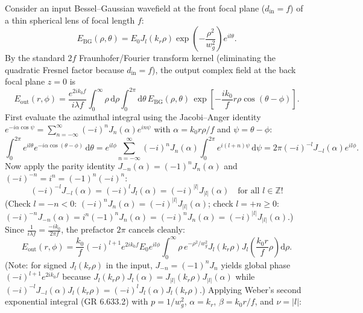 \documentclass[10pt,letterpaper]{article}
\newcommand{\abs}[1]{\lvert #1 \rvert}
\newcommand{\dd}{\mathrm{d}}
\numberwithin{equation}{section}
\begin{document}
Consider an input Bessel--Gaussian wavefield at the front focal plane ($d_{\mathrm{in}} = f$) of a thin spherical lens of focal length $f$:
\begin{equation}
  E_{\mathrm{BG}}(\rho,\theta) = E_0 J_l(k_r\rho)\exp\!\left(-\frac{\rho^2}{w_g^2}\right) e^{il\theta}.
\end{equation}
By the standard $2f$ Fraunhofer/Fourier transform kernel (eliminating the quadratic Fresnel factor because $d_{\mathrm{in}} = f$), the output complex field at the back focal plane $z = 0$ is
\begin{equation}
  E_{\mathrm{out}}(r,\phi) = \frac{e^{2ik_0 f}}{i\lambda f} \int_0^\infty \rho\,\dd\rho \int_0^{2\pi} \dd\theta\, E_{\mathrm{BG}}(\rho,\theta)\,\exp\!\left[-\frac{ik_0}{f} r\rho\cos(\theta-\phi)\right].
\end{equation}
First evaluate the azimuthal integral using the Jacobi--Anger identity $e^{-i\alpha\cos\psi} = \sum_{n=-\infty}^\infty (-i)^n J_n(\alpha) e^{in\psi}$ with $\alpha = k_0 r\rho/f$ and $\psi = \theta - \phi$:
\begin{equation}
  \int_0^{2\pi} e^{il\theta} e^{-i\alpha\cos(\theta-\phi)}\,\dd\theta = e^{il\phi}\sum_{n=-\infty}^\infty (-i)^n J_n(\alpha)\int_0^{2\pi} e^{i(l+n)\psi}\,\dd\psi = 2\pi (-i)^{-l} J_{-l}(\alpha) e^{il\phi}.
\end{equation}
Now apply the parity identity $J_{-n}(\alpha) = (-1)^n J_n(\alpha)$ and $(-i)^{-n} = i^n = (-1)^n(-i)^n$:
\begin{equation}
  (-i)^{-l} J_{-l}(\alpha) = (-i)^l J_l(\alpha) = (-i)^{\abs{l}} J_{\abs{l}}(\alpha)\quad\text{for all }l \in \mathbb{Z}!
\end{equation}
(Check $l = -n < 0$: $(-i)^n J_n(\alpha) = (-i)^{\abs{l}} J_{\abs{l}}(\alpha)$; check $l = +n \ge 0$: $(-i)^{-n} J_{-n}(\alpha) = i^n (-1)^n J_n(\alpha) = (-i)^n J_n(\alpha) = (-i)^{\abs{l}} J_{\abs{l}}(\alpha)$.)
Since $\frac{1}{i\lambda f} = \frac{-i k_0}{2\pi f}$, the prefactor $2\pi$ cancels cleanly:
\begin{equation}
  E_{\mathrm{out}}(r,\phi) = \frac{k_0}{f} (-i)^{l+1} e^{2ik_0 f} E_0 e^{il\phi} \int_0^\infty \rho\,e^{-\rho^2/w_g^2} J_l(k_r\rho) J_l\!\left(\frac{k_0 r}{f}\rho\right)\dd\rho.
\end{equation}
(Note: for signed $J_l(k_r\rho)$ in the input, $J_{-n} = (-1)^n J_n$ yields global phase $(-i)^{l+1} e^{2ik_0 f}$ because $J_l(k_r\rho)J_l(\alpha) = J_{\abs{l}}(k_r\rho)J_{\abs{l}}(\alpha)$ while $(-i)^{-l} J_{-l}(\alpha) J_l(k_r\rho) = (-i)^l J_l(\alpha) J_l(k_r\rho)$.)
Applying Weber's second exponential integral (GR 6.633.2) with $p = 1/w_g^2$, $\alpha = k_r$, $\beta = k_0 r / f$, and $\nu = \abs{l}$:
\end{document}
